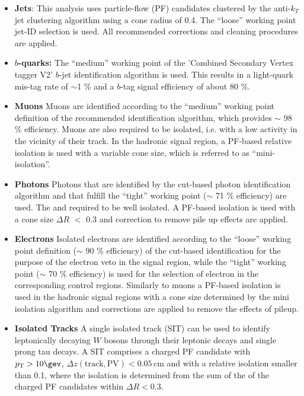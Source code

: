 \begin{itemize}
  \item{\bf Jets}: This analysis uses particle-flow (PF) candidates clustered by the anti-$k_{T}$ jet clustering algorithm \cite{Cacciari:2008gp} using a cone radius of 0.4. The ``loose'' working point jet-ID selection is used. All recommended corrections and cleaning procedures are applied.   %
    
  \item{\bf $b$-quarks:} The  ``medium'' working point of the 'Combined Secondary Vertex tagger V2' $b$-jet identification algorithm is used. This results in a light-quark mis-tag rate of $\sim$1 \%  and a $b$-tag signal efficiency of about 80 \%.   

  \item{\bf Muons} Muons are identified according to the ``medium'' working point definition of the recommended identification algorithm, which provides $\sim$ 98 $\%$ efficiency. 
Muons are also required to be isolated, i.e. with a low activity in the vicinity of their track. In the hadronic signal region, a PF-based relative isolation is used with a variable cone size, which is referred to as ``mini-isolation''. 

  \item{\bf Photons} Photons that are identified by the cut-based photon identification algorithm \cite{photon-id} and that fulfill the ``tight'' working point ($\sim$ 71 $\%$ efficiency) are used. The and required to be well isolated.  A PF-based isolation is used with a cone size $\Delta R$ $<$ 0.3  and correction to remove pile up effects are applied.


  \item{\bf Electrons} Isolated electrons are identified according to the ``loose'' working point definition ($\sim$ 90 $\%$ efficiency)  of the cut-based identification \cite{electron-id} for the purpose of the electron veto in the signal region, while the ``tight'' working point ($\sim$ 70 $\%$ efficiency) is used for the selection of electron in the corresponding control regions. Similarly to muons a PF-based isolation \cite{pf-photon} is used in the hadronic signal regions with a cone size determined by the mini isolation algorithm and corrections are applied to remove the effects of pileup.

  \item{\bf Isolated Tracks}  A single isolated track (SIT) can be used to identify leptonically decaying $W$ bosons through their leptonic decays and single prong tau decays.
    A SIT comprises a charged PF candidate with $\Pt > 10 \gev$, $\Delta z(\mathrm{track}, \mathrm{PV}) < 0.05 \, \mathrm{cm}$  and with a relative isolation smaller than 0.1, where the isolation is determined from the sum of the \Pt of the charged PF candidates within $\Delta R < 0.3$.


\end{itemize}
